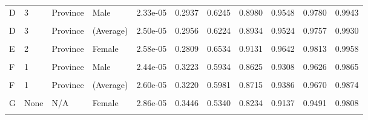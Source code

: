 \documentclass[
]{report}
\begin{document}
\begin{table}[!h]
\begin{tabular}[t]{llllrrrrrrr}
D & 3 & Province & Male & 2.33e-05 & 0.2937 & 0.6245 & 0.8980 & 0.9548 & 0.9780 & 0.9943\\
\addlinespace
\cellcolor{gray!6}{D} & \cellcolor{gray!6}{3} & \cellcolor{gray!6}{Province} & \cellcolor{gray!6}{Female} & \cellcolor{gray!6}{2.66e-05} & \cellcolor{gray!6}{0.2974} & \cellcolor{gray!6}{0.6203} & \cellcolor{gray!6}{0.8888} & \cellcolor{gray!6}{0.9501} & \cellcolor{gray!6}{0.9735} & \cellcolor{gray!6}{0.9916}\\
D & 3 & Province & (Average) & 2.50e-05 & 0.2956 & 0.6224 & 0.8934 & 0.9524 & 0.9757 & 0.9930\\
\cellcolor{gray!6}{E} & \cellcolor{gray!6}{2} & \cellcolor{gray!6}{Province} & \cellcolor{gray!6}{Male} & \cellcolor{gray!6}{2.36e-05} & \cellcolor{gray!6}{0.3019} & \cellcolor{gray!6}{0.6117} & \cellcolor{gray!6}{0.8888} & \cellcolor{gray!6}{0.9489} & \cellcolor{gray!6}{0.9743} & \cellcolor{gray!6}{0.9925}\\
E & 2 & Province & Female & 2.58e-05 & 0.2809 & 0.6534 & 0.9131 & 0.9642 & 0.9813 & 0.9958\\
\cellcolor{gray!6}{E} & \cellcolor{gray!6}{2} & \cellcolor{gray!6}{Province} & \cellcolor{gray!6}{(Average)} & \cellcolor{gray!6}{2.47e-05} & \cellcolor{gray!6}{0.2914} & \cellcolor{gray!6}{0.6325} & \cellcolor{gray!6}{0.9010} & \cellcolor{gray!6}{0.9565} & \cellcolor{gray!6}{0.9778} & \cellcolor{gray!6}{0.9941}\\
\addlinespace
F & 1 & Province & Male & 2.44e-05 & 0.3223 & 0.5934 & 0.8625 & 0.9308 & 0.9626 & 0.9865\\
\cellcolor{gray!6}{F} & \cellcolor{gray!6}{1} & \cellcolor{gray!6}{Province} & \cellcolor{gray!6}{Female} & \cellcolor{gray!6}{2.77e-05} & \cellcolor{gray!6}{0.3218} & \cellcolor{gray!6}{0.6027} & \cellcolor{gray!6}{0.8805} & \cellcolor{gray!6}{0.9463} & \cellcolor{gray!6}{0.9714} & \cellcolor{gray!6}{0.9884}\\
F & 1 & Province & (Average) & 2.60e-05 & 0.3220 & 0.5981 & 0.8715 & 0.9386 & 0.9670 & 0.9874\\
\cellcolor{gray!6}{G} & \cellcolor{gray!6}{None} & \cellcolor{gray!6}{N/A} & \cellcolor{gray!6}{Male} & \cellcolor{gray!6}{2.49e-05} & \cellcolor{gray!6}{0.3351} & \cellcolor{gray!6}{0.5690} & \cellcolor{gray!6}{0.8431} & \cellcolor{gray!6}{0.9233} & \cellcolor{gray!6}{0.9589} & \cellcolor{gray!6}{0.9854}\\
G & None & N/A & Female & 2.86e-05 & 0.3446 & 0.5340 & 0.8234 & 0.9137 & 0.9491 & 0.9808\\
\addlinespace
\cellcolor{gray!6}{G} & \cellcolor{gray!6}{None} & \cellcolor{gray!6}{N/A} & \cellcolor{gray!6}{(Average)} & \cellcolor{gray!6}{2.68e-05} & \cellcolor{gray!6}{0.3398} & \cellcolor{gray!6}{0.5515} & \cellcolor{gray!6}{0.8332} & \cellcolor{gray!6}{0.9185} & \cellcolor{gray!6}{0.9540} & \cellcolor{gray!6}{0.9831}\\
\bottomrule
\end{tabular}
\end{table}
\end{document}
